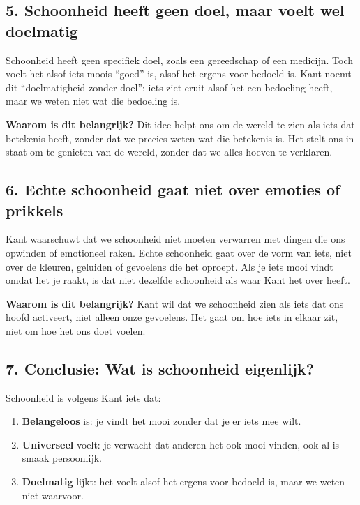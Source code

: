 \documentclass[11pt, showtrims]{memoir}
\begin{document}
\subsection*{5. Schoonheid heeft geen doel, maar voelt wel doelmatig}

Schoonheid heeft geen specifiek doel, zoals een gereedschap of een medicijn. Toch voelt het alsof iets moois ``goed'' is, alsof het ergens voor bedoeld is. Kant noemt dit ``doelmatigheid zonder doel'': iets ziet eruit alsof het een bedoeling heeft, maar we weten niet wat die bedoeling is.

\smallskip

\textbf{Waarom is dit belangrijk?}
Dit idee helpt ons om de wereld te zien als iets dat betekenis heeft, zonder dat we precies weten wat die betekenis is. Het stelt ons in staat om te genieten van de wereld, zonder dat we alles hoeven te verklaren.

\subsection*{6. Echte schoonheid gaat niet over emoties of prikkels}

Kant waarschuwt dat we schoonheid niet moeten verwarren met dingen die ons opwinden of emotioneel raken. Echte schoonheid gaat over de vorm van iets, niet over de kleuren, geluiden of gevoelens die het oproept. Als je iets mooi vindt omdat het je raakt, is dat niet dezelfde schoonheid als waar Kant het over heeft.

\smallskip

\textbf{Waarom is dit belangrijk?}
Kant wil dat we schoonheid zien als iets dat ons hoofd activeert, niet alleen onze gevoelens. Het gaat om hoe iets in elkaar zit, niet om hoe het ons doet voelen.

\subsection*{7. Conclusie: Wat is schoonheid eigenlijk?}

Schoonheid is volgens Kant iets dat:
\begin{enumerate}
    \item \textbf{Belangeloos} is: je vindt het mooi zonder dat je er iets mee wilt.
    \item \textbf{Universeel} voelt: je verwacht dat anderen het ook mooi vinden, ook al is smaak persoonlijk.
    \item \textbf{Doelmatig} lijkt: het voelt alsof het ergens voor bedoeld is, maar we weten niet waarvoor.
\end{enumerate}
\end{document}
